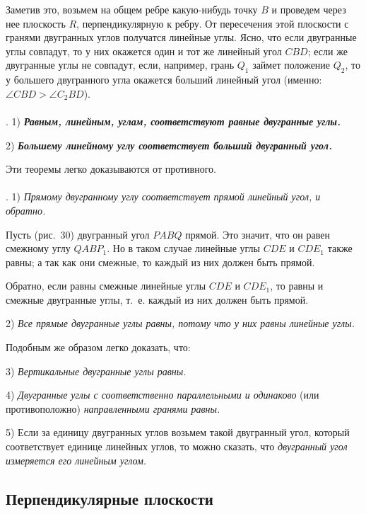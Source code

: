 \documentclass[twoside]{book}
\begin{document}
Заметив это, возьмем на общем ребре какую-нибудь точку $B$ и проведем через нее плоскость $R$, перпендикулярную к ребру.
От пересечения этой плоскости с гранями двугранных углов получатся линейные углы.
Ясно, что если двугранные углы совпадут, то у них окажется один и тот же линейный угол $CBD$;
если же двугранные углы не совпадут, если, например, грань $Q_1$ займет положение $Q_2$, то у большего двугранного угла окажется больший линейный угол (именно: $\angle CBD > \angle C_2BD$).

\paragraph{}\label{1938/s40}
.
1) \textbf{\emph{Равным, линейным, углам, соответствуют равные двугранные углы.}}

2) \textbf{\emph{Большему линейному углу соответствует больший двугранный угол.}}

Эти теоремы легко доказываются от противного.

\paragraph{}\label{1938/s41}
. 1) \emph{Прямому двугранному углу соответствует прямой линейный угол, и обратно.}

Пусть (рис.~30) двугранный угол $PABQ$ прямой.
Это значит, что он равен смежному углу $QABP_1$.
Но в таком случае линейные углы $CDE$ и $CDE_1$ также равны;
а так как они смежные, то каждый из них должен быть прямой.

Обратно, если равны смежные линейные углы $CDE$ и $CDE_1$, то равны и смежные двугранные углы, т.~е. каждый из них должен быть прямой.

2) \emph{Все прямые двугранные углы равны, потому что у них равны линейные углы.}

Подобным же образом легко доказать, что:

3) \emph{Вертикальные двугранные углы равны.}

4) \emph{Двугранные углы с соответственно параллельными и одинаково} (или противоположно) \emph{направленными гранями равны.}

5) Если за единицу двугранных углов возьмем такой двугранный угол, который соответствует единице линейных углов, то можно сказать, что \emph{двугранный угол измеряется его линейным углом}.

\subsection*{Перпендикулярные плоскости}
\end{document}

